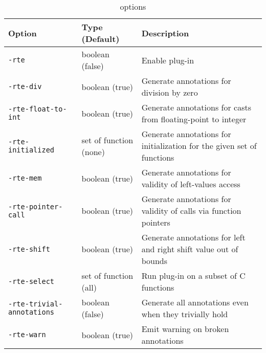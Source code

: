 \begin{table}
\begin{center}
\begin{tabular}{|l|l|p{7cm}|}
\hline
{\bf Option} & {\bf Type (Default)} & {\bf Description} \\
\hline
\lstinline|-rte| & boolean (false) & Enable \rte{} plug-in \\
\hline
\lstinline|-rte-div| & boolean (true) & Generate annotations for division by
zero \\
\hline
\lstinline |-rte-float-to-int| & boolean (true) & Generate annotations for
casts from floating-point to integer \\
\hline
\lstinline |-rte-initialized| & set of function (none) & Generate annotations
for initialization for the given set of functions \\
\hline
\lstinline |-rte-mem| & boolean (true) & Generate annotations for validity of
left-values access \\
\hline
\lstinline |-rte-pointer-call| & boolean (true) & Generate annotations for
validity of calls via function pointers \\
\hline
\lstinline|-rte-shift| & boolean (true) & Generate annotations for left and
right shift value out of bounds \\
\hline
\lstinline |-rte-select| & set of function (all) & Run plug-in on a subset of C
functions \\
\hline
\lstinline |-rte-trivial-annotations| & boolean (false) & Generate all
annotations even when they trivially hold \\
\hline
\lstinline |-rte-warn| & boolean (true) & Emit warning on broken annotations \\
\hline
\end{tabular}
\caption{\rte{} options} \label{options}
\end{center}
\end{table}

\cleardoublepage
{}
{}



